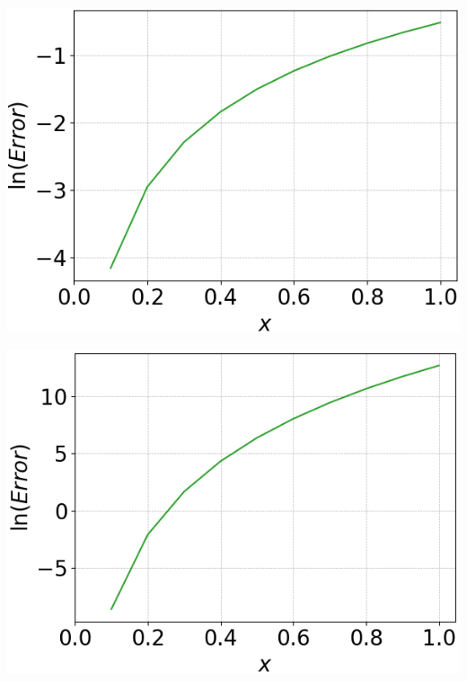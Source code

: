 \documentclass[12pt, a4paper]{article}
\begin{document}
\begin{minipage}{0.45\textwidth}
	\centering
	\includegraphics[width=\linewidth]{q4_series_order=1}

	\vspace*{-0.3cm}

	\label{q4_series_o1}
\end{minipage}
\hspace{0.9cm}
\begin{minipage}{0.45\textwidth}
	\centering
	\includegraphics[width=\linewidth]{q4_series_order=9}

	\vspace*{-0.3cm}

	\label{q4_series_o2}
\end{minipage}
\end{document}
